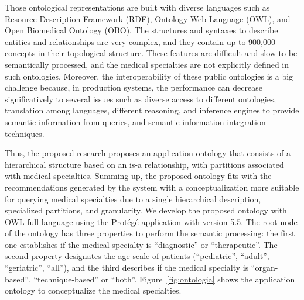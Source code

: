\documentclass[sustainability,article,submit,pdftex,moreauthors]{Definitions/mdpi}
\begin{document}
Those ontological representations are built with diverse languages such as Resource Description Framework (RDF), Ontology Web Language (OWL), and Open Biomedical Ontology (OBO). The structures and syntaxes to describe entities and relationships are very complex, and they contain up to 900,000 concepts in their topological structure. These features are difficult and slow to be semantically processed, and the medical specialties are not explicitly defined in such ontologies. Moreover, the interoperability of these public ontologies is a big challenge because, in production systems, the performance can decrease significatively to several issues such as diverse access to different ontologies, translation among languages, different reasoning, and inference engines to provide semantic information from queries, and semantic information integration techniques.

Thus, the proposed research proposes an application ontology that consists of a hierarchical structure based on an is-a relationship, with partitions associated with medical specialties. Summing up, the proposed ontology fits with the recommendations generated by the system with a conceptualization more suitable for querying medical specialties due to a single hierarchical description, specialized partitions, and granularity. We develop the proposed ontology with OWL-full language using the Protégé application with version 5.5. The root node of the ontology has three properties to perform the semantic processing: the first one establishes if the medical specialty is “diagnostic” or “therapeutic”. The second property designates the age scale of patients (“pediatric”, “adult”, “geriatric”, “all”), and the third describes if the medical specialty is “organ-based”, “technique-based” or “both”. Figure~\ref{fig:ontologia} shows the application ontology to conceptualize the medical specialties.
\end{document}
